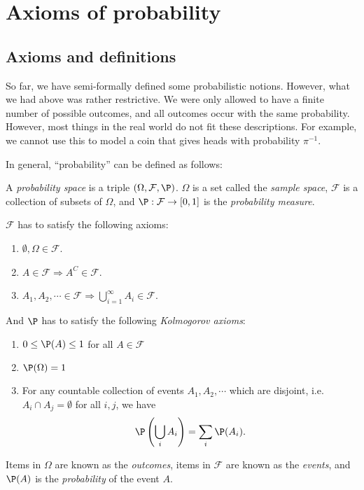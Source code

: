 \documentclass[a4paper]{article}
\begin{document}
\section{Axioms of probability}
\label{sec:axioms}
\subsection{Axioms and definitions}
So far, we have semi-formally defined some probabilistic notions. However, what we had above was rather restrictive. We were only allowed to have a finite number of possible outcomes, and all outcomes occur with the same probability. However, most things in the real world do not fit these descriptions. For example, we cannot use this to model a coin that gives heads with probability $\pi^{-1}$.

In general, ``probability'' can be defined as follows:
\begin{defi}
  A \emph{probability space} is a triple $(\Omega, \mathcal{F}, \P)$. $\Omega$ is a set called the \emph{sample space}, $\mathcal{F}$ is a collection of subsets of $\Omega$, and $\P: \mathcal{F}\to [0, 1]$ is the \emph{probability measure}.

  $\mathcal{F}$ has to satisfy the following axioms:
  \begin{enumerate}
    \item $\emptyset, \Omega\in \mathcal{F}$.
    \item $A\in \mathcal{F} \Rightarrow A^C\in \mathcal{F}$.
    \item $A_1, A_2, \cdots \in \mathcal{F} \Rightarrow \bigcup_{i = 1}^\infty A_i \in \mathcal{F}$.
  \end{enumerate}
  And $\P$ has to satisfy the following \emph{Kolmogorov axioms}:
  \begin{enumerate}
    \item $0 \leq \P(A) \leq 1 $ for all $A\in \mathcal{F}$
    \item $\P(\Omega) = 1$
    \item For any countable collection of events $A_1, A_2, \cdots$ which are disjoint, i.e.\ $A_i\cap A_j = \emptyset$ for all $i, j$, we have
      \[
        \P\left(\bigcup_i A_i\right) = \sum_i \P(A_i).
      \]
  \end{enumerate}
  Items in $\Omega$ are known as the \emph{outcomes}, items in $\mathcal{F}$ are known as the \emph{events}, and $\P(A)$ is the \emph{probability} of the event $A$.
\end{defi}
\end{document}
